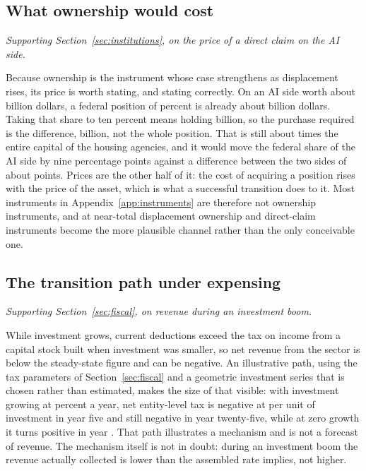 \subsection{What ownership would cost}

\emph{Supporting Section~\ref{sec:institutions}, on the price of a direct claim on the AI side.}

Because ownership is the instrument whose case strengthens as displacement rises, its price is
worth stating, and stating correctly. On an AI side worth about  billion
dollars, a federal position of  percent is already about
 billion dollars. Taking that share to ten percent means holding
 billion, so the purchase required is the difference,
 billion, not the whole position. That is still about
 times the entire capital of the housing agencies, and it
would move the federal share of the AI side by nine percentage points against a difference between
the two sides of about  points. Prices are the other half of it: the cost of
acquiring a position rises with the price of the asset, which is what a successful transition does
to it. Most instruments in Appendix~\ref{app:instruments} are therefore not ownership instruments,
and at near-total displacement ownership and direct-claim instruments become the more plausible
channel rather than the only conceivable one.

\subsection{The transition path under expensing}

\emph{Supporting Section~\ref{sec:fiscal}, on revenue during an investment boom.}

While investment grows, current deductions exceed the tax on income from a capital stock built
when investment was smaller, so net revenue from the sector is below the steady-state figure and
can be negative. An illustrative path, using the tax parameters of Section~\ref{sec:fiscal} and a
geometric investment series that is chosen rather than estimated, makes the size of that visible:
with investment growing at  percent a year, net entity-level tax is
negative at  per unit of investment in year five and still negative in
year twenty-five, while at zero growth it turns positive in year
. That path illustrates a mechanism and is not a forecast of
revenue. The mechanism itself is not in doubt: during an investment boom the revenue actually
collected is lower than the assembled rate implies, not higher.

